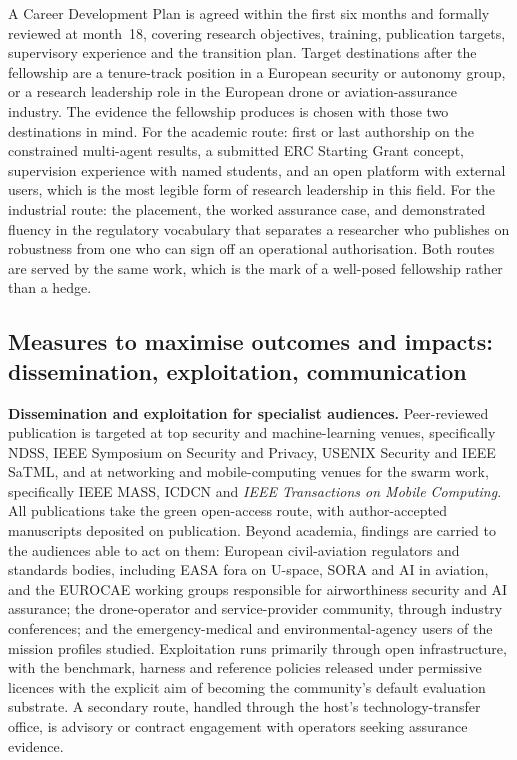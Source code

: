 \documentclass[11pt,a4paper]{article}
\begin{document}
A Career Development Plan is agreed within the first six months and formally reviewed at month~18, covering research objectives, training, publication targets, supervisory experience and the transition plan. Target destinations after the fellowship are a tenure-track position in a
European security or autonomy group, or a research leadership role in the
European drone or aviation-assurance industry. The evidence the fellowship
produces is chosen with those two destinations in mind. For the academic route:
first or last authorship on the constrained multi-agent results, a submitted
ERC Starting Grant concept, supervision experience with named students, and an
open platform with external users, which is the most legible form of research
leadership in this field. For the industrial route: the placement, the worked
assurance case, and demonstrated fluency in the regulatory vocabulary that
separates a researcher who publishes on robustness from one who can sign off an
operational authorisation. Both routes are served by the same work, which is the
mark of a well-posed fellowship rather than a hedge.

\subsection{Measures to maximise outcomes and impacts: dissemination, exploitation, communication}

\textbf{Dissemination and exploitation for specialist audiences.} Peer-reviewed publication is targeted at top security and machine-learning venues, specifically NDSS, IEEE Symposium on Security and Privacy, USENIX Security and IEEE SaTML, and at networking and mobile-computing venues for the swarm work, specifically IEEE MASS, ICDCN and \emph{IEEE Transactions on Mobile Computing}. All publications take the green open-access route, with author-accepted manuscripts deposited on publication. Beyond academia, findings are carried to the audiences able to act on them: European civil-aviation regulators and standards bodies, including EASA fora on U-space, SORA and AI in aviation, and the EUROCAE working groups responsible for airworthiness security and AI assurance; the drone-operator and service-provider community, through industry conferences; and the emergency-medical and environmental-agency users of the mission profiles studied. Exploitation runs primarily through open infrastructure, with the benchmark, harness and reference policies released under permissive licences with the explicit aim of becoming the community's default evaluation substrate. A secondary route, handled through the host's technology-transfer office, is advisory or contract engagement with operators seeking assurance evidence.
\end{document}
